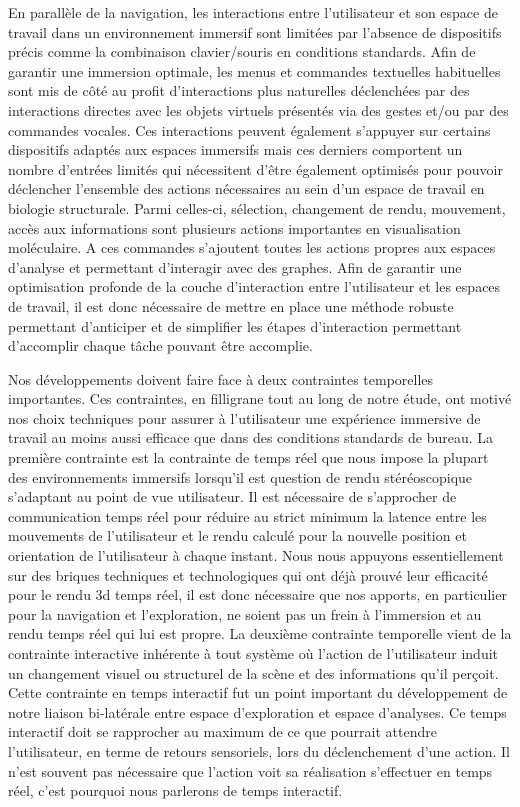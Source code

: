 En parallèle de la navigation, les interactions entre l'utilisateur et son espace de travail dans un environnement immersif sont limitées par l'absence de dispositifs précis comme la combinaison clavier/souris en conditions standards. Afin de garantir une immersion optimale, les menus et commandes textuelles habituelles sont mis de côté au profit d'interactions plus naturelles déclenchées par des interactions directes avec les objets virtuels présentés via des gestes et/ou par des commandes vocales. Ces interactions peuvent également s'appuyer sur certains dispositifs adaptés aux espaces immersifs mais ces derniers comportent un nombre d'entrées limités qui nécessitent d'être également optimisés pour pouvoir déclencher l'ensemble des actions nécessaires au sein d'un espace de travail en biologie structurale. Parmi celles-ci, sélection, changement de rendu, mouvement, accès aux informations sont plusieurs actions importantes en visualisation moléculaire. A ces commandes s'ajoutent toutes les actions propres aux espaces d'analyse et permettant d'interagir avec des graphes. Afin de garantir une optimisation profonde de la couche d'interaction entre l'utilisateur et les espaces de travail, il est donc nécessaire de mettre en place une méthode robuste permettant d'anticiper et de simplifier les étapes d'interaction permettant d'accomplir chaque tâche pouvant être accomplie. 

Nos développements doivent faire face à deux contraintes temporelles importantes. Ces contraintes, en filligrane tout au long de notre étude, ont motivé nos choix techniques pour assurer à l'utilisateur une expérience immersive de travail au moins aussi efficace que dans des conditions standards de bureau.
La première contrainte est la contrainte de temps réel que nous impose la plupart des environnements immersifs lorsqu'il est question de rendu stéréoscopique s'adaptant au point de vue utilisateur. Il est nécessaire de s'approcher de communication temps réel pour réduire au strict minimum la latence entre les mouvements de l'utilisateur et le rendu calculé pour la nouvelle position et orientation de l'utilisateur à chaque instant. Nous nous appuyons essentiellement sur des briques techniques et technologiques qui ont déjà prouvé leur efficacité pour le rendu 3d temps réel, il est donc nécessaire que nos apports, en particulier pour la navigation et l'exploration, ne soient pas un frein à l'immersion et au rendu temps réel qui lui est propre.
La deuxième contrainte temporelle vient de la contrainte interactive inhérente à tout système où l'action de l'utilisateur induit un changement visuel ou structurel de la scène et des informations qu'il perçoit. Cette contrainte en temps interactif fut un point important du développement de notre liaison bi-latérale entre espace d'exploration et espace d'analyses. Ce temps interactif doit se rapprocher au maximum de ce que pourrait attendre l'utilisateur, en terme de retours sensoriels, lors du déclenchement d'une action. Il n'est souvent pas nécessaire que l'action voit sa réalisation s'effectuer en temps réel, c'est pourquoi nous parlerons de temps interactif.


